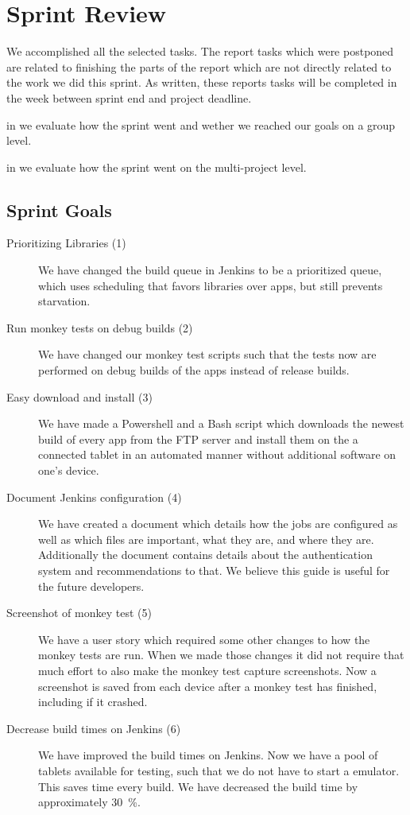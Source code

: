 \chapter{Sprint Review}\label{chap:sprint4_end}
 We accomplished all the selected tasks. The report tasks which were postponed are related to finishing the parts of the report which are not directly related to the work we did this sprint. As written, these reports tasks will be completed in the week between sprint end and project deadline.

\begin{chapterorganization}
    \item in  we evaluate how the sprint went and wether we reached our goals on a group level.
    \item in  we evaluate how the sprint went on the multi-project level.
\end{chapterorganization}

\section{Sprint Goals}\label{sec:s4_goals}
\begin{description}
    \item[Prioritizing Libraries (1)] We have changed the build queue in Jenkins to be a prioritized queue, which uses scheduling that favors libraries over apps, but still prevents starvation.
    \item[Run monkey tests on debug builds (2)] We have changed our monkey test scripts such that the tests now are performed on debug builds of the apps instead of release builds.
    \item[Easy download and install (3)] We have made a Powershell and a Bash script which downloads the newest build of every app from the FTP server and install them on the a connected tablet in an automated manner without additional software on one's device.
    \item[Document Jenkins configuration (4)] We have created a document which details how the jobs are configured as well as which files are important, what they are, and where they are. Additionally the document contains details about the authentication system and recommendations to that. We believe this guide is useful for the future developers.
    \item[Screenshot of monkey test (5)] We have a user story which required some other changes to how the monkey tests are run. When we made those changes it did not require that much effort to also make the monkey test capture screenshots. Now a screenshot is saved from each device after a monkey test has finished, including if it crashed.
    \item[Decrease build times on Jenkins (6)] We have improved the build times on Jenkins. Now we have a pool of tablets available for testing, such that we do not have to start a emulator. This saves time every build. We have decreased the build time by approximately \SI{30}{\percent}.
\end{description}
